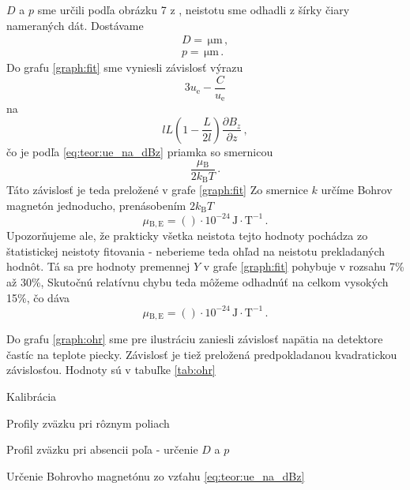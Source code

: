 \documentclass[a4paper, 10pt]{article}
\newcommand{\unit}[1]{\ensuremath{\, \mathrm{#1}}}
\newcommand{\di}[1]{\ensuremath{_\mathrm{#1}}}
\begin{document}
$D$ a $p$ sme určili podľa obrázku 7 z \cite{stud}, neistotu sme odhadli z šírky čiary nameraných dát. Dostávame
\begin{align*}
D = \unit{\mu m}\,,\\
p = \unit{\mu m}\,.
\end{align*}
Do grafu \ref{graph:fit} sme vyniesli závislosť výrazu
$$
3u\di e - \frac{C}{u\di e}
$$
na
$$
l L \left(1-\frac{L}{2l}\right)\frac{\partial{B_z}}{\partial z}\,,
$$
čo je podľa \ref{eq:teor:ue_na_dBz} priamka so smernicou
$$\frac{\mu\di B}{2k\di B T}\,.$$
Táto závislosť je teda preložené v grafe \ref{graph:fit}
Zo smernice $k$ určíme Bohrov magnetón jednoducho, prenásobením $2k\di B T$
$$
\mu\di {B, E} = ()\cdot 10^{-24}\unit{J\cdot T^{-1}}\,.
$$
Upozorňujeme ale, že prakticky všetka neistota tejto hodnoty pochádza zo štatistickej neistoty fitovania - neberieme teda ohľad na neistotu prekladaných hodnôt. Tá sa pre hodnoty premennej $Y$ v grafe \ref{graph:fit} pohybuje v rozsahu 7\% až 30\%, Skutočnú relatívnu chybu teda môžeme odhadnúť na celkom vysokých 15\%, čo dáva
$$
\mu\di {B, E} = ()\cdot 10^{-24}\unit{J\cdot T^{-1}}\,.
$$

Do grafu \ref{graph:ohr} sme pre ilustráciu zaniesli závislosť napätia na detektore častíc na teplote piecky. Závislosť je tiež preložená predpokladanou kvadratickou závislosťou. Hodnoty sú v tabuľke \ref{tab:ohr}

\begin{graph}[t]
\centering
\vspace*{-15pt}

\caption{ Kalibrácia \label{graph:kalibracia}}
\end{graph}

\begin{graph}[t]
\centering
\vspace*{-15pt}

\caption{ Profily zväzku pri rôznym poliach \label{graph:profily}}
\end{graph}

\begin{graph}[t]
\centering
\vspace*{-15pt}

\caption{ Profil zväzku pri absencii poľa - určenie $D$ a $p$ \label{graph:profil}}
\end{graph}

\begin{graph}[t]
\centering
\vspace*{-15pt}

\caption{ Určenie Bohrovho magnetónu zo vzťahu \ref{eq:teor:ue_na_dBz} \label{graph:fit}}
\end{graph}
\end{document}
